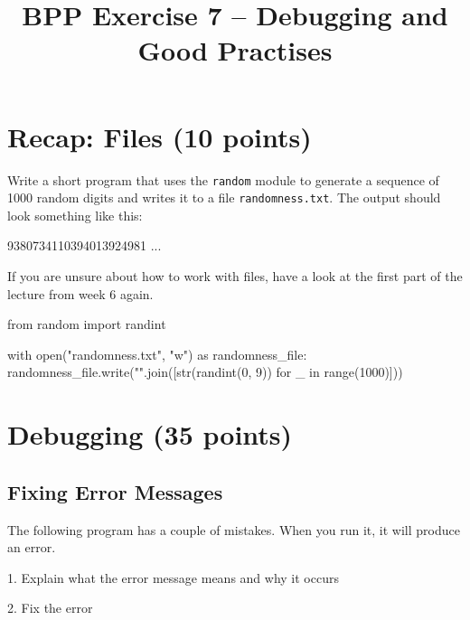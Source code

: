 

\title{BPP Exercise 7 -- Debugging and Good Practises}





\section{Recap: Files (10 points)}

Write a short program that uses the \texttt{random} module to generate a sequence of 1000 random digits and writes it to a file \texttt{randomness.txt}. The output should look something like this:

\begin{outputcode}
9380734110394013924981 ...
\end{outputcode}

\noindent If you are unsure about how to work with files, have a look at the first part of the lecture from week 6 again.

\vspace{1em}

\begin{solution}
    \begin{pythoncode}
from random import randint

with open("randomness.txt", "w") as randomness_file:
    randomness_file.write("".join([str(randint(0, 9)) for _ in range(1000)]))
    \end{pythoncode}
\end{solution}

\section{Debugging (35 points)}

\subsection{Fixing Error Messages}

The following program has a couple of mistakes. When you run it, it will produce an error.

\vspace{1em}

1. Explain what the error message means and why it occurs

2. Fix the error

\vspace{1em}

